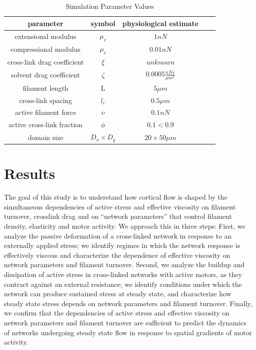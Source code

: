 \begin{table}[h]
	\centering
	\caption{Simulation Parameter Values}
	\label{table:para}
	\begin{tabular}{|c|c|c|c|c|}
		\hline
		{\bf parameter}             & {\bf symbol} & {\bf physiological estimate}          \\ \hline
		extensional modulus         & $\mu_e$        & $1 nN $                                               \\
		compressional modulus             & $\mu_c$     & $ 0.01 nN $                           \\
		cross-link drag coefficient & $\xi$      & $unknown $              \\
		solvent drag coefficient     & $\zeta$        & $0.0005 \frac{nN s}{\mu m^2} $      \\
		filament length             & L            & $5 \mu m$                                          \\
		cross-link spacing          & $l_c$        & $0.5 \mu m$                                         \\
		active filament force          & $\upsilon$        & $0.1 nN$                                         \\
		active cross-link fraction          & $\phi$        & $0.1<0.9$                                         \\
		domain size                 & $D_x\times D_y$            & $20\times 50 \mu m$                                 \\ \hline
	\end{tabular}
\end{table}





\section{Results}
The goal of this study is to understand how cortical flow is shaped by the simultaneous dependencies of active stress and effective viscosity on filament turnover, crosslink drag and on ``network parameters'' that control  filament density, elasticity and motor activity.   We approach this in three steps: First, we analyze the passive deformation of a cross-linked network in response to an externally applied stress; we identify regimes in which the network response is effectively viscous and characterize the dependence of effective viscosity on network parameters and filament turnover.  Second, we analyze the buildup and dissipation of active stress in cross-linked networks with active motors, as they contract against an external resistance; we identify conditions under which the network can produce sustained stress at steady state, and characterize how steady state stress depends on network parameters and filament turnover. Finally, we confirm that the dependencies of active stress and effective viscosity on network parameters and filament turnover are sufficient to predict the dynamics of networks undergoing steady state flow in response to spatial gradients of motor activity.
